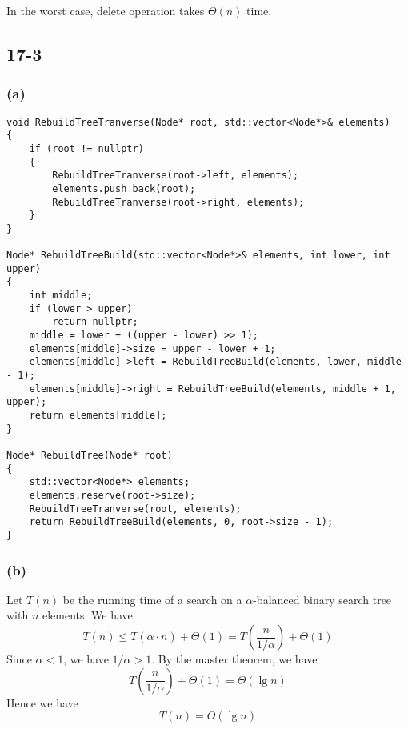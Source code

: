 In the worst case, delete operation takes $\Theta(n)$ time.

\subsection*{17-3}

\subsubsection*{(a)}

\begin{verbatim}
void RebuildTreeTranverse(Node* root, std::vector<Node*>& elements)
{
    if (root != nullptr)
    {
        RebuildTreeTranverse(root->left, elements);
        elements.push_back(root);
        RebuildTreeTranverse(root->right, elements);
    }
}

Node* RebuildTreeBuild(std::vector<Node*>& elements, int lower, int upper)
{
    int middle;
    if (lower > upper)
        return nullptr;
    middle = lower + ((upper - lower) >> 1);
    elements[middle]->size = upper - lower + 1;
    elements[middle]->left = RebuildTreeBuild(elements, lower, middle - 1);
    elements[middle]->right = RebuildTreeBuild(elements, middle + 1, upper);
    return elements[middle];
}

Node* RebuildTree(Node* root)
{
    std::vector<Node*> elements;
    elements.reserve(root->size);
    RebuildTreeTranverse(root, elements);
    return RebuildTreeBuild(elements, 0, root->size - 1);
}
\end{verbatim}

\subsubsection*{(b)}

Let $T(n)$ be the running time of a search on 
a $\alpha$-balanced binary search tree with $n$ elements.
We have
\begin{equation*}
    T(n) \leq T(\alpha \cdot n) + \Theta(1)
    = T(\frac{n}{1/\alpha}) + \Theta(1)
\end{equation*}
Since $\alpha < 1$, we have $1/\alpha > 1$.
By the master theorem,
we have
\begin{equation*}
    T(\frac{n}{1/\alpha}) + \Theta(1) = \Theta(\lg n)
\end{equation*}
Hence we have
\begin{equation*}
    T(n) = O(\lg n)
\end{equation*}

